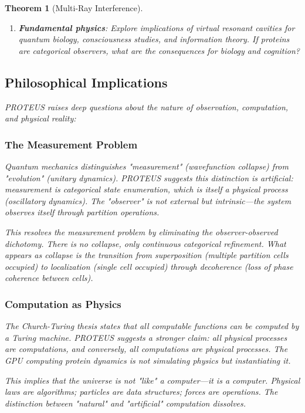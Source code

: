 \documentclass[11pt,a4paper]{article}
\newtheorem{theorem}{Theorem}[section]
\begin{document}
\begin{theorem}[Multi-Ray Interference]
\begin{enumerate}
\item \textbf{Fundamental physics}: Explore implications of virtual resonant cavities for quantum biology, consciousness studies, and information theory. If proteins are categorical observers, what are the consequences for biology and cognition?
\end{enumerate}

\subsection{Philosophical Implications}

PROTEUS raises deep questions about the nature of observation, computation, and physical reality:

\subsubsection{The Measurement Problem}

Quantum mechanics distinguishes "measurement" (wavefunction collapse) from "evolution" (unitary dynamics). PROTEUS suggests this distinction is artificial: measurement is categorical state enumeration, which is itself a physical process (oscillatory dynamics). The "observer" is not external but intrinsic—the system observes itself through partition operations.

This resolves the measurement problem by eliminating the observer-observed dichotomy. There is no collapse, only continuous categorical refinement. What appears as collapse is the transition from superposition (multiple partition cells occupied) to localization (single cell occupied) through decoherence (loss of phase coherence between cells).

\subsubsection{Computation as Physics}

The Church-Turing thesis states that all computable functions can be computed by a Turing machine. PROTEUS suggests a stronger claim: \textit{all physical processes are computations}, and conversely, \textit{all computations are physical processes}. The GPU computing protein dynamics is not simulating physics but instantiating it.

This implies that the universe is not "like" a computer—it \textit{is} a computer. Physical laws are algorithms; particles are data structures; forces are operations. The distinction between "natural" and "artificial" computation dissolves.


\end{theorem}
\end{document}

